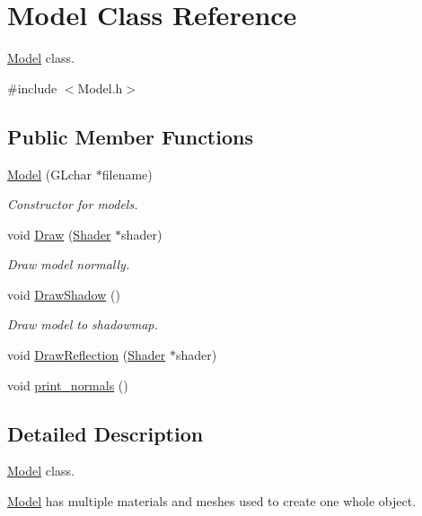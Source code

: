 \hypertarget{class_model}{}\section{Model Class Reference}
\label{class_model}


\mbox{\hyperlink{class_model}{Model}} class.  




{\ttfamily \#include $<$Model.\+h$>$}

\subsection*{Public Member Functions}
\begin{DoxyCompactItemize}
\item 
\mbox{\hyperlink{class_model_a0521de97cb482940ccf4a416d35fa336}{Model}} (G\+Lchar $\ast$filename)
\begin{DoxyCompactList}\small\item\em Constructor for models. \end{DoxyCompactList}\item 
void \mbox{\hyperlink{class_model_a8444e404fcc9cc66827c2f628b92ece3}{Draw}} (\mbox{\hyperlink{class_shader}{Shader}} $\ast$shader)
\begin{DoxyCompactList}\small\item\em Draw model normally. \end{DoxyCompactList}\item 
void \mbox{\hyperlink{class_model_ac2e396a05a6b7af011c213dcbd2dae21}{Draw\+Shadow}} ()
\begin{DoxyCompactList}\small\item\em Draw model to shadowmap. \end{DoxyCompactList}\item 
void \mbox{\hyperlink{class_model_ae55524ff90fd956b7cb3817a9bab139a}{Draw\+Reflection}} (\mbox{\hyperlink{class_shader}{Shader}} $\ast$shader)
\item 
void \mbox{\hyperlink{class_model_acc6d38d268db3e4b88bbd32cd28c8f58}{print\+\_\+normals}} ()
\end{DoxyCompactItemize}


\subsection{Detailed Description}
\mbox{\hyperlink{class_model}{Model}} class. 

\mbox{\hyperlink{class_model}{Model}} has multiple materials and meshes used to create one whole object. 

